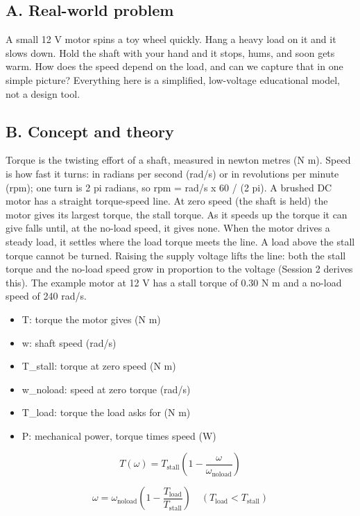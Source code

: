 \documentclass[11pt,a4paper]{article}
\begin{document}
\subsection*{A. Real-world problem}
A small 12 V motor spins a toy wheel quickly. Hang a heavy load on it and it slows down. Hold the shaft with your hand and it stops, hums, and soon gets warm. How does the speed depend on the load, and can we capture that in one simple picture? Everything here is a simplified, low-voltage educational model, not a design tool.

\subsection*{B. Concept and theory}
Torque is the twisting effort of a shaft, measured in newton metres (N m). Speed is how fast it turns: in radians per second (rad/s) or in revolutions per minute (rpm); one turn is 2 pi radians, so rpm = rad/s x 60 / (2 pi). A brushed DC motor has a straight torque-speed line. At zero speed (the shaft is held) the motor gives its largest torque, the stall torque. As it speeds up the torque it can give falls until, at the no-load speed, it gives none. When the motor drives a steady load, it settles where the load torque meets the line. A load above the stall torque cannot be turned. Raising the supply voltage lifts the line: both the stall torque and the no-load speed grow in proportion to the voltage (Session 2 derives this). The example motor at 12 V has a stall torque of 0.30 N m and a no-load speed of 240 rad/s.

\begin{itemize}[nosep]
\item T: torque the motor gives (N m)
\item w: shaft speed (rad/s)
\item T\_stall: torque at zero speed (N m)
\item w\_noload: speed at zero torque (rad/s)
\item T\_load: torque the load asks for (N m)
\item P: mechanical power, torque times speed (W)
\end{itemize}

\begin{equation*}
T(\omega)=T_{\mathrm{stall}}\left(1-\frac{\omega}{\omega_{\mathrm{noload}}}\right)
\end{equation*}

\begin{equation*}
\omega=\omega_{\mathrm{noload}}\left(1-\frac{T_{\mathrm{load}}}{T_{\mathrm{stall}}}\right)\quad(T_{\mathrm{load}}<T_{\mathrm{stall}})
\end{equation*}
\end{document}
